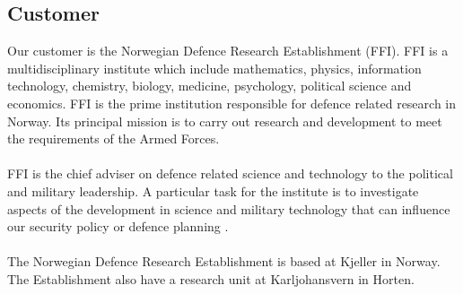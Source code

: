 \subsection{Customer}
Our customer is the  Norwegian  Defence  Research  Establishment (FFI). FFI is a multidisciplinary institute which include mathematics, physics, information technology, chemistry, biology, medicine, psychology, political science and economics. FFI is the prime institution responsible for defence related research in Norway. Its principal mission is to carry out research and development to meet the requirements of the Armed Forces.
\\\\
FFI is the chief adviser on defence related science and technology to the political and military leadership. A particular task for the institute is to investigate aspects of the development in science and military technology that can influence our security policy or defence planning \cite{FFI}.
\\\\
The  Norwegian  Defence  Research  Establishment is based at Kjeller in Norway. The Establishment also have a research unit at Karljohansvern in Horten. 